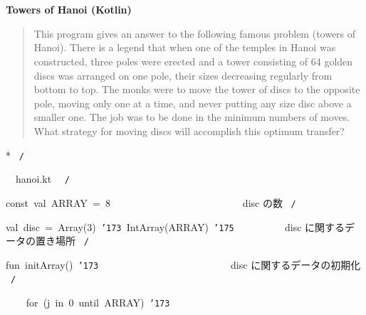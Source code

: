 \documentclass[a4paper,10pt]{article}
\def\mc{\relax}
\begin{document}
\tt\mc 

\noindent
\mbox{}\rm\mc {\tt /}{\tt *}\  \hrulefill *


\ %

\centerline{\bf Towers of Hanoi (Kotlin)}

\begin{quote}

This program gives an answer to the following famous problem (towers of
Hanoi).
There is a legend that when one of the temples in Hanoi was constructed,
three poles were erected and a tower consisting of 64 golden discs was
arranged on one pole, their sizes decreasing regularly from bottom to top.
The monks were to move the tower of discs to the opposite pole, moving
only one at a time, and never putting any size disc above a smaller one.
The job was to be done in the minimum numbers of moves. What strategy for
moving discs will accomplish this optimum transfer?
\end{quote}


* \hrulefill \rm\mc \ {\tt *}{\tt /}
\tt\mc 

\noindent
\mbox{}\hfill

\noindent
\mbox{}\hfill

\noindent
\mbox{}\rm\mc {\tt /}{\tt *}\  \hrulefill\ hanoi.kt \ \hrulefill \rm\mc \ {\tt *}{\tt /}
\tt\mc 

\noindent
\mbox{}\hfill

\noindent
\mbox{}\hfill

\noindent
\mbox{}const{\tt\mc \ }val{\tt\mc \ }ARRAY{\tt\mc \ }={\tt\mc \ }8{\tt\mc \ \ \ \ \ \ \ \ }{\tt\mc \ \ \ \ \ \ \ \ }{\tt\mc \ \ \ \ \ \ \ \ }\rm\mc {\tt /}{\tt *}\  \ disc の数 \hfill \rm\mc \ {\tt *}{\tt /}
\tt\mc 

\noindent
\mbox{}\hfill

\noindent
\mbox{}val{\tt\mc \ }disc{\tt\mc \ }={\tt\mc \ }Array(3){\tt\mc \ }{\tt\char'173}{\tt\mc \ }IntArray(ARRAY){\tt\mc \ }{\tt\char'175}{\tt\mc \ \ \ \ \ \ \ \ }\rm\mc {\tt /}{\tt *}\  \ disc に関するデータの置き場所
					   \hfill \rm\mc \ {\tt *}{\tt /}
\tt\mc 

\noindent
\mbox{}\hfill

\noindent
\mbox{}fun{\tt\mc \ }initArray(){\tt\mc \ }{\tt\char'173}{\tt\mc \ \ \ \ \ \ \ \ }{\tt\mc \ \ \ \ \ \ \ \ }{\tt\mc \ \ \ \ \ \ \ \ }\rm\mc {\tt /}{\tt *}\  \ disc に関するデータの初期化
					   \hfill \rm\mc \ {\tt *}{\tt /}
\tt\mc 

\noindent
\mbox{}{\tt\mc \ }{\tt\mc \ }{\tt\mc \ }{\tt\mc \ }for{\tt\mc \ }(j{\tt\mc \ }in{\tt\mc \ }0{\tt\mc \ }until{\tt\mc \ }ARRAY){\tt\mc \ }{\tt\char'173}
\end{document}
